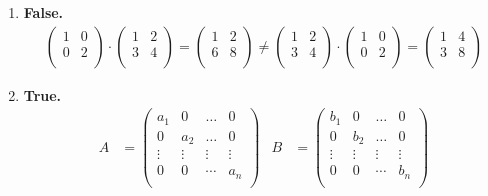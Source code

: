 \documentclass{article}
\begin{document}
\begin{enumerate}
    \item \textbf{False.} \begin{align*}
        \begin{pmatrix}
            1 & 0 \\ 0 & 2 \\
        \end{pmatrix} \cdot \begin{pmatrix}
            1 & 2 \\ 3 & 4 \\
        \end{pmatrix} = \begin{pmatrix}
            1 & 2 \\ 6 & 8 \\
        \end{pmatrix} \neq \begin{pmatrix}
            1 & 2 \\ 3 & 4 \\
        \end{pmatrix} \cdot \begin{pmatrix}
            1 & 0 \\ 0 & 2 \\
        \end{pmatrix} = \begin{pmatrix}
            1 & 4 \\ 3 & 8 \\
        \end{pmatrix}
    \end{align*}

    \item \textbf{True.} \begin{align*}
        A &= \begin{pmatrix}
            a_1 & 0 & \ldots & 0 \\
            0 & a_2 & \ldots & 0 \\
            \vdots & \vdots & \vdots & \vdots \\
            0 & 0 & \cdots & a_n \\
        \end{pmatrix}
        &
        B &= \begin{pmatrix}
            b_1 & 0 & \ldots & 0 \\
            0 & b_2 & \ldots & 0 \\
            \vdots & \vdots & \vdots & \vdots \\
            0 & 0 & \cdots & b_n \\
        \end{pmatrix}
    \end{align*}


\end{enumerate}
\end{document}
